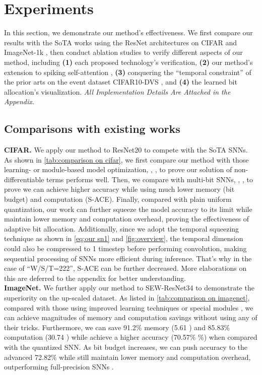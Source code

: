 \section{Experiments}
\label{sec:experiments}
In this section, we demonstrate our method's effectiveness. We first compare our results with the SoTA works using the ResNet architectures on CIFAR \cite{krizhevsky2009learning} and ImageNet-1k \cite{deng2009imagenet}, then
conduct ablation studies to verify different aspects of our method, including \textbf{(1)} each proposed technology's verification, \textbf{(2)} our method's extension to spiking self-attention \cite{zhou2022spikformer}, \textbf{(3)} conquering the “temporal constraint” of the prior arts \cite{shen2024conventional} on the event dataset CIFAR10-DVS \cite{li2017cifar10}, and \textbf{(4)} the learned bit allocation's visualization. \emph{All Implementation Details Are Attached in the Appendix.} 

\subsection{Comparisons with existing works}
\label{sbsec:comparison}
\textbf{CIFAR.} We apply our method to ResNet20 \cite{guo2024ternary} to compete with the SoTA SNNs. As shown in  \cref{tab:comparison on cifar}, we first compare our method with those learning- or module-based model optimization, \eg,  \cite{li2021differentiable, deng2021temporal, zheng2021going}, to prove our solution of non-differentiable terms performs well. Then, we compare with multi-bit SNNs, \eg,  \cite{guo2024ternary,xiao2024multi}, to prove we can achieve higher accuracy while using much lower memory (bit budget) and computation (S-ACE). Finally, compared with plain uniform quantization, our work can further squeeze the model accuracy to its limit while maintain lower memory and computation overhead, proving the effectiveness of adaptive bit allocation. Additionally, since we adopt the temporal squeezing technique as shown in  \cref{eq:our sn1} and  \cref{fig:overview}, the temporal dimension could also be compressed to 1 timestep before performing convolution, making sequential processing of SNNs more efficient during inference. That's why in the case of “W/S/T=222”, S-ACE can be further decreased. More elaborations on this are deferred to the appendix for better understanding.
\\\textbf{ImageNet.} We further apply our method to SEW-ResNet34 to demonstrate the superiority on the up-scaled dataset. As listed in  \cref{tab:comparison on imagenet}, compared with those using improved learning techniques or special modules  \cite{rathi2020enabling, zheng2021going,li2021differentiable,hu2024advancing}, we can achieve magnitudes of memory and computation savings without using any of their tricks. Furthermore, we can save 91.2\% memory (5.61 ) and  85.83\% computation (30.74 ) while achieve a higher accuracy (70.57\% \%) when compared with the quantized SNN. As bit budget increases, we can push accuracy to the advanced 72.82\% while still maintain lower memory and computation overhead, outperforming full-precision SNNs  \cite{guo2024ternary, fang2021deep, deng2021temporal}.

